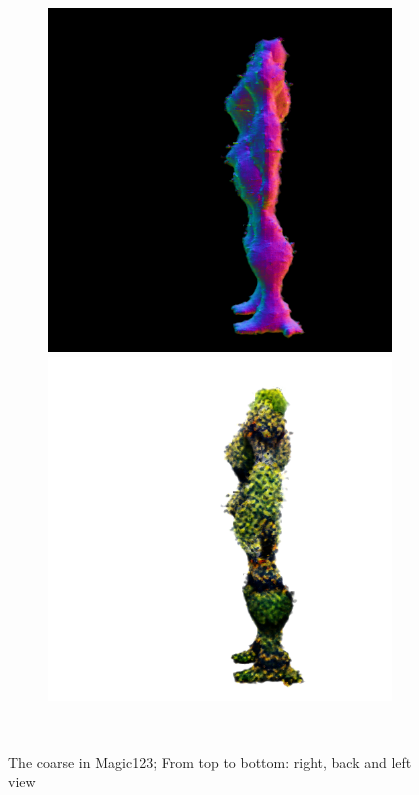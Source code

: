 \begin{figure}[ht]
\begin{subfigure}[b]{0.222\textwidth}
        \includegraphics[width=\textwidth]{figures/appendix/magic123_coarse_robot_left_10000_part2.png}
        \includegraphics[width=\textwidth]{figures/appendix/magic123_coarse_robot_left_10000_part1.png}
        \caption{}
    \end{subfigure}
    \caption{The coarse in Magic123; From top to bottom: right, back and left view}~\label{fig:generationCoarseMagic123}
\end{figure}

